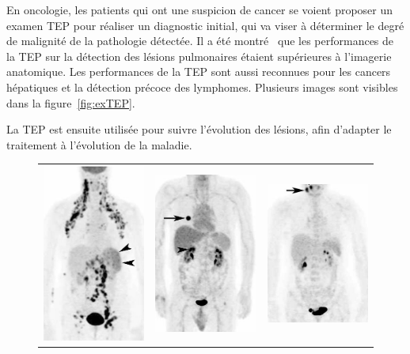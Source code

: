 En oncologie, les patients qui ont une suspicion de cancer se voient proposer un examen TEP pour réaliser un diagnostic initial, qui va viser à déterminer le degré de malignité de la pathologie détectée. Il a été montré~\cite{gould2001accuracy} que les performances de la TEP sur la détection des lésions pulmonaires étaient supérieures à l'imagerie anatomique. Les performances de la TEP sont aussi reconnues pour les cancers hépatiques et la détection précoce des lymphomes. Plusieurs images sont visibles dans la figure~\ref{fig:exTEP}.

La TEP est ensuite utilisée pour suivre l'évolution des lésions, afin d'adapter le traitement à l'évolution de la maladie.

\begin{figure}[h!]
\centering
\begin{tabular}{c c c}
\includegraphics[width=5cm]{images/ex_lymphome} & \includegraphics[width=5cm]{images/ex_poumon} & \includegraphics[width=5cm]{images/ex_cou} \\

\end{tabular}
\end{figure}
